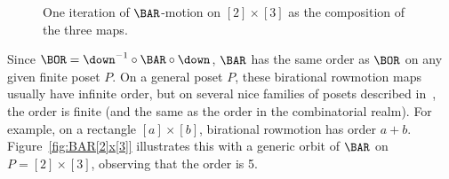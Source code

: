 \begin{figure}[htb]
\caption{One iteration of $\BAR$-motion on $[2]\times[3]$ as the composition of the three maps.}
\label{fig:2x3-BAR}
\end{figure}

\begin{exam}\label{ex:BAR[2]x[3]}
Since $\BOR=\down^{-1} \circ \BAR \circ \down$,
$\BAR$ has the same order as $\BOR$ on any given
finite poset $P$.
On a general poset $P$, these birational rowmotion maps usually have infinite order, but on several nice families of posets described in~\cite{GrRo15,GrRo16,hopkins2019minuscule}, the order is finite (and the same as the order in the combinatorial realm).
For example, on a rectangle $[a]\times[b]$,
birational rowmotion has order $a+b$.
Figure~\ref{fig:BAR[2]x[3]} illustrates this with a generic orbit of $\BAR$ on $P=[2]\times[3]$, observing that the order is 5.
\end{exam}

